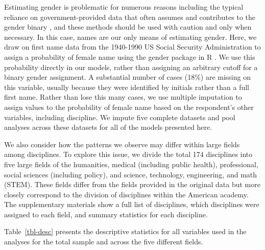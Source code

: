 \documentclass[
  10pt,
  letterpaper,
]{article}
\begin{document}
Estimating gender is problematic for numerous reasons including the
typical reliance on government-provided data that often assumes and
contributes to the gender binary \citep{mihaljevic_reflections_2019},
and these methods should be used with caution and only when necessary.
In this case, names are our only means of estimating gender. Here, we
draw on first name data from the 1940-1990 US Social Security
Administration to assign a probability of female name using the gender
package in R \citep{blevins_jane_2015}. We use this probability directly
in our models, rather than assigning an arbitrary cutoff for a binary
gender assignment. A substantial number of cases (18\%) are missing on
this variable, usually because they were identified by initials rather
than a full first name. Rather than lose this many cases, we use
multiple imputation to assign values to the probability of female name
based on the respondent's other variables, including discipline. We
impute five complete datasets and pool analyses across these datasets
for all of the models presented here.

We also consider how the patterns we observe may differ within large
fields among disciplines. To explore this issue, we divide the total 174
disciplines into five large fields of the humanities, medical (including
public health), professional, social sciences (including policy), and
science, technology, engineering, and math (STEM). These fields differ
from the fields provided in the original data but more closely
correspond to the division of disciplines within the American academy.
The supplementary materials show a full list of disciplines, which
disciplines were assigned to each field, and summary statistics for each
discipline.

Table~\ref{tbl-desc} presents the descriptive statistics for all
variables used in the analyses for the total sample and across the five
different fields.
\end{document}
